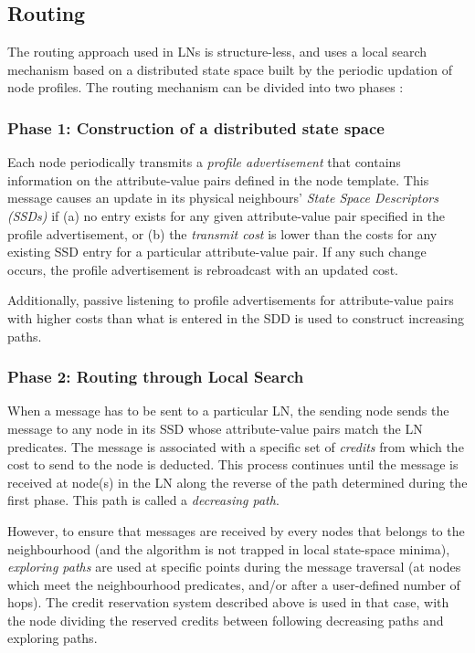 \subsection{Routing}

The routing approach used in LNs is structure-less, and uses a local search
mechanism based on a distributed state space built by the periodic updation of
node profiles. The routing mechanism can be divided into two phases \cite{mottola_LNAbstraction}:

\subsubsection{Phase 1: Construction of a distributed state space}
Each node periodically transmits a \emph{profile advertisement} that contains
information on the attribute-value pairs defined in the node template. This message
causes an
update in its physical neighbours' \emph{State Space Descriptors (SSDs)} if (a)
no
entry exists for any given attribute-value pair specified in the profile
advertisement, or (b) the \emph{transmit cost} is lower than the costs for any
existing SSD entry for a particular attribute-value pair. If any such change
occurs, the profile advertisement is rebroadcast with an updated cost. 

Additionally, passive listening to profile advertisements for attribute-value
pairs with higher costs than what is entered in the SDD is used to construct
increasing paths.

\subsubsection{Phase 2: Routing through Local Search}
When a message has to be sent to a particular LN, the sending node sends the
message to any node in its SSD whose attribute-value pairs match the LN
predicates. The message is associated with a specific set of \emph{credits} from
which the cost to send to the node is deducted. This process continues until the
message is received at node(s) in the LN along the reverse of the path
determined during the first phase. This path is called a \emph{decreasing path}.

However, to ensure that messages are received by every nodes that belongs to the
neighbourhood (and the algorithm is not trapped in local state-space minima),
\emph{exploring paths} are used at specific points during the message traversal
(at nodes which meet the neighbourhood predicates, and/or after a user-defined
number of hops). The credit reservation system described above is used in that
case, with the node dividing the reserved credits between following decreasing
paths and exploring paths.

